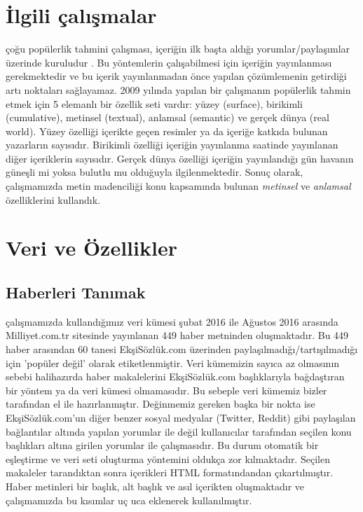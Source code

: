 \documentclass[conference]{IEEEtran}
\begin{document}
\section{\.{I}lgili \c{c}al{\i}\c{s}malar}
\c{c}o\u{g}u popülerlik tahmini \c{c}al{\i}\c{s}mas{\i}, i\c{c}eri\u{g}in ilk ba\c{s}ta ald{\i}\u{g}{\i} yorumlar/payla\c{s}{\i}mlar üzerinde kuruludur \cite{szabo_predicting_2010}. Bu yöntemlerin \c{c}al{\i}\c{s}abilmesi i\c{c}in i\c{c}eri\u{g}in yay{\i}nlanmas{\i} gerekmektedir ve bu i\c{c}erik yay{\i}nlanmadan önce yap{\i}lan \c{c}özümlemenin getirdi\u{g}i art{\i} noktalar{\i} sa\u{g}layamaz.
2009 y{\i}l{\i}nda yap{\i}lan bir \c{c}al{\i}\c{s}man{\i}n \cite{tsagkias_predicting_2009} popülerlik tahmin etmek i\c{c}in 5 elemanl{\i} bir özellik seti vard{\i}r: yüzey (surface), birikimli (cumulative), metinsel (textual), anlamsal (semantic) ve ger\c{c}ek dünya (real world). Yüzey özelli\u{g}i i\c{c}erikte ge\c{c}en resimler ya da i\c{c}eri\u{g}e katk{\i}da bulunan yazarlar{\i}n say{\i}s{\i}d{\i}r. Birikimli özelli\u{g}i i\c{c}eri\u{g}in yay{\i}nlanma saatinde yay{\i}nlanan di\u{g}er i\c{c}eriklerin say{\i}s{\i}d{\i}r. Ger\c{c}ek dünya özelli\u{g}i i\c{c}eri\u{g}in yay{\i}nland{\i}\u{g}{\i} gün havan{\i}n güne\c{s}li mi yoksa bulutlu mu oldu\u{g}uyla ilgilenmektedir. Sonu\c{c} olarak, \c{c}al{\i}\c{s}mam{\i}zda metin madencili\u{g}i konu kapsam{\i}nda bulunan \emph{metinsel} ve \emph{anlamsal} özelliklerini kulland{\i}k.

\section{Veri ve Özellikler}
\subsection{Haberleri Tan{\i}mak}
\c{c}al{\i}\c{s}mam{\i}zda kulland{\i}\u{g}{\i}m{\i}z veri kümesi \c{s}ubat 2016 ile A\u{g}ustos 2016 aras{\i}nda Milliyet.com.tr sitesinde yay{\i}nlanan 449 haber metninden olu\c{s}maktad{\i}r. Bu 449 haber aras{\i}ndan 60 tanesi Ek\c{s}iSözlük.com üzerinden payla\c{s}{\i}lmad{\i}\u{g}{\i}/tart{\i}\c{s}{\i}lmad{\i}\u{g}{\i} i\c{c}in 'popüler de\u{g}il' olarak etiketlenmi\c{s}tir. Veri kümemizin say{\i}ca az olmas{\i}n{\i}n sebebi halihaz{\i}rda haber makalelerini Ek\c{s}iSözlük.com ba\c{s}l{\i}klar{\i}yla ba\u{g}da\c{s}t{\i}ran bir yöntem ya da veri kümesi olmamas{\i}d{\i}r. Bu sebeple veri kümemiz bizler taraf{\i}ndan el ile haz{\i}rlanm{\i}\c{s}t{\i}r. De\u{g}inmemiz gereken ba\c{s}ka bir nokta ise Ek\c{s}iSözlük.com'un di\u{g}er benzer sosyal medyalar (Twitter, Reddit) gibi payla\c{s}{\i}lan ba\u{g}lant{\i}lar alt{\i}nda yap{\i}lan yorumlar ile de\u{g}il kullan{\i}c{\i}lar taraf{\i}ndan se\c{c}ilen konu ba\c{s}l{\i}klar{\i} alt{\i}na girilen yorumlar ile \c{c}al{\i}\c{s}mas{\i}d{\i}r. Bu durum otomatik bir e\c{s}le\c{s}tirme ve veri seti olu\c{s}turma yöntemini olduk\c{c}a zor k{\i}lmaktad{\i}r. Se\c{c}ilen makaleler tarand{\i}ktan sonra i\c{c}erikleri HTML format{\i}ndandan \c{c}{\i}kart{\i}lm{\i}\c{s}t{\i}r. Haber metinleri bir ba\c{s}l{\i}k, alt ba\c{s}l{\i}k ve as{\i}l i\c{c}erikten olu\c{s}maktad{\i}r ve \c{c}al{\i}\c{s}mam{\i}zda bu k{\i}s{\i}mlar u\c{c} uca eklenerek kullan{\i}lm{\i}\c{s}t{\i}r.
\end{document}
